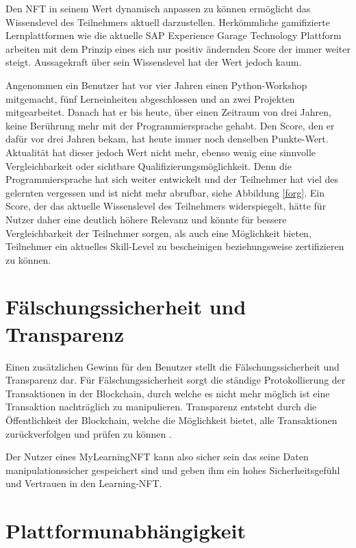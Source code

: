 Den \ac{NFT} in seinem Wert dynamisch anpassen zu können ermöglicht das \dq Wissenslevel\dq{} des Teilnehmers aktuell darzustellen.
Herkömmliche gamifizierte Lernplattformen wie die aktuelle SAP Experience Garage Technology Plattform arbeiten mit dem Prinzip eines sich nur positiv ändernden Score der immer weiter steigt.
Aussagekraft über sein \dq Wissenslevel\dq{} hat der Wert jedoch kaum.

Angenommen ein Benutzer hat vor vier Jahren einen Python-Workshop mitgemacht, fünf Lerneinheiten abgeschlossen und an zwei Projekten mitgearbeitet.
Danach hat er bis heute, über einen Zeitraum von drei Jahren, keine Berührung mehr mit der Programmiersprache gehabt.
Den Score, den er dafür vor drei Jahren bekam, hat heute immer noch denselben Punkte-Wert. 
Aktualität hat dieser jedoch Wert nicht mehr, ebenso wenig eine sinnvolle Vergleichbarkeit oder sichtbare Qualifizierungsmöglichkeit.
Denn die Programmiersprache hat sich weiter entwickelt und der Teilnehmer hat viel des gelernten vergessen und ist nicht mehr abrufbar, siehe Abbildung \ref{forg}.
Ein Score, der das aktuelle \dq Wissenslevel\dq{} des Teilnehmers widerspiegelt, hätte für Nutzer daher eine deutlich höhere Relevanz und könnte für bessere Vergleichbarkeit der Teilnehmer sorgen,
als auch eine Möglichkeit bieten, Teilnehmer ein aktuelles Skill-Level zu bescheinigen beziehungsweise zertifizieren zu können.

\section{Fälschungssicherheit und Transparenz} \label{fundt}

Einen zusätzlichen Gewinn für den Benutzer stellt die Fälschungssicherheit und Transparenz dar.
Für Fälschungssicherheit sorgt die ständige Protokollierung der Transaktionen in der Blockchain, durch welche es nicht mehr möglich ist eine Transaktion nachträglich zu manipulieren.
Transparenz entsteht durch die Öffentlichkeit der Blockchain, welche die Möglichkeit bietet, alle Transaktionen zurückverfolgen und prüfen zu können \parencite[vgl.][13]{WILKENS.2019}.

Der Nutzer eines MyLearning\ac{NFT} kann also sicher sein das seine Daten manipulationssicher gespeichert sind und geben ihm ein hohes Sicherheitsgefühl und Vertrauen in den Learning-\ac{NFT}.

\section{Plattformunabhängigkeit}

